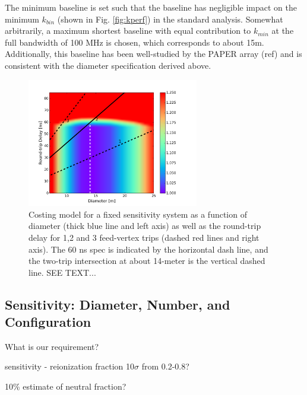 \documentclass{article}
\begin{document}
The minimum baseline is set such that the baseline has negligible impact on the minimum $k_{bin}$ (shown in Fig. \ref{fig:kperf}) in the standard analysis.  Somewhat arbitrarily, a maximum shortest baseline with equal contribution to $k_{min}$ at the full bandwidth of 100 MHz is chosen, which corresponds to about 15m.  Additionally, this baseline has been well-studied by the PAPER array (ref) and is consistent with the diameter specification derived above.

\begin{figure}[t]
\centerline{
\includegraphics[width=7.5cm]{plots/costfigNew.png} 
}
\caption{\small Costing model for a fixed sensitivity system as a function of diameter (thick blue line and left axis) as well as the round-trip delay for 1,2 and 3 feed-vertex trips (dashed red lines and right axis).  The 60 ns spec is indicated by the horizontal dash line, and the two-trip intersection at about 14-meter is the vertical dashed line.  SEE TEXT...
\label{fig:costfig}}
\end{figure}

\subsection{Sensitivity:  Diameter, Number, and Configuration}
What is our requirement?

sensitivity - reionization fraction 10$\sigma$ from 0.2-0.8?

10\% estimate of neutral fraction?
\end{document}
